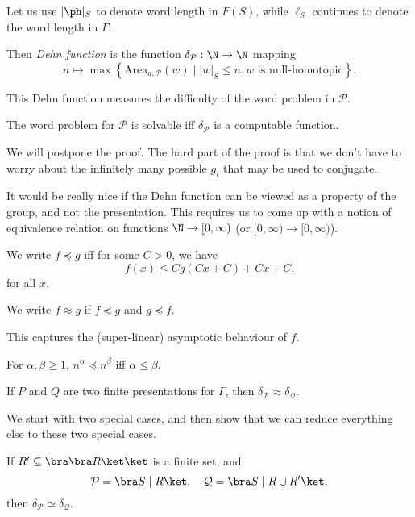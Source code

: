 \documentclass[a4paper]{article}
\begin{document}
Let us use $|\ph|_S$ to denote word length in $F(S)$, while $\ell_S$ continues to denote the word length in $\Gamma$.

\begin{defi}
  Then \emph{Dehn function} is the function $\delta_{\mathcal{P}}: \N \to \N$ mapping
  \[
    n \mapsto \max \left\{ \mathrm{Area}_{a, \mathcal{P}} (w) \mid |w|_S \leq n, w \text{ is null-homotopic}\right\}.
  \]
\end{defi}
This Dehn function measures the difficulty of the word problem in $\mathcal{P}$.

\begin{prop}
  The word problem for $\mathcal{P}$ is solvable iff $\delta_{\mathcal{P}}$ is a computable function.
\end{prop}

We will postpone the proof. The hard part of the proof is that we don't have to worry about the infinitely many possible $g_i$ that may be used to conjugate.

It would be really nice if the Dehn function can be viewed as a property of the group, and not the presentation. This requires us to come up with a notion of equivalence relation on functions $\N \to [0, \infty)$ (or $[0, \infty) \to [0, \infty)$).

\begin{defi}[$\preccurlyeq$]\index{$\preccurlyeq$}
  We write $f \preccurlyeq g$ iff for some $C > 0$, we have
  \[
    f(x) \leq C g(Cx + C) + Cx + C.
  \]
  for all $x$.

  We write $f \approx g$ if $f \preccurlyeq g$ and $g \preccurlyeq f$.
\end{defi}
This captures the (super-linear) asymptotic behaviour of $f$.

\begin{eg}
  For $\alpha, \beta \geq 1$, $n^\alpha \preccurlyeq n^\beta$ iff $\alpha \leq \beta$.
\end{eg}

\begin{prop}
  If $P$ and $Q$ are two finite presentations for $\Gamma$, then $\delta_{\mathcal{P}} \approx \delta_{\mathcal{Q}}$.
\end{prop}

We start with two special cases, and then show that we can reduce everything else to these two special cases.
\begin{lemma}
  If $R' \subseteq \bra \bra R \ket \ket$ is a finite set, and
  \[
    \mathcal{P} = \bra S \mid R \ket,\quad \mathcal{Q} = \bra S \mid R \cup R'\ket,
  \]
  then $\delta_{\mathcal{P}} \simeq \delta_{\mathcal{Q}}$.
\end{lemma}
\end{document}
